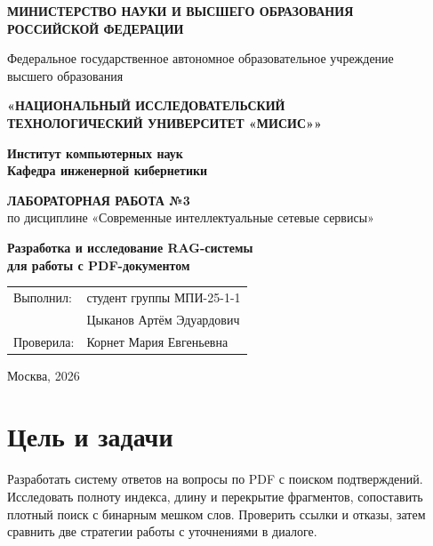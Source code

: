 \documentclass[12pt,a4paper]{article}
\begin{document}
\sloppy
\begin{titlepage}
  \begin{center}
    \textbf{МИНИСТЕРСТВО НАУКИ И ВЫСШЕГО ОБРАЗОВАНИЯ\\РОССИЙСКОЙ ФЕДЕРАЦИИ}
    \vspace{0.5cm}

    Федеральное государственное автономное образовательное учреждение\\
    высшего образования
    \vspace{0.3cm}

    \textbf{«НАЦИОНАЛЬНЫЙ ИССЛЕДОВАТЕЛЬСКИЙ\\
    ТЕХНОЛОГИЧЕСКИЙ УНИВЕРСИТЕТ «МИСИС»»}
    \vspace{1.5cm}

    \textbf{Институт компьютерных наук}\\[0.3cm]
    \textbf{Кафедра инженерной кибернетики}
    \vspace{1.7cm}

    \textbf{ЛАБОРАТОРНАЯ РАБОТА №3}\\[0.4cm]
    по дисциплине «Современные интеллектуальные сетевые сервисы»
    \vspace{1.5cm}

    {\Large\bfseries Разработка и исследование RAG-системы\\
    для работы с PDF-документом}
  \end{center}
  \vfill
  \begin{flushright}
    \begin{tabular}{@{}ll@{}}
      Выполнил: & студент группы МПИ-25-1-1 \\
                & Цыканов Артём Эдуардович \\[0.5cm]
      Проверила: & Корнет Мария Евгеньевна
    \end{tabular}
  \end{flushright}
  \vfill
  \begin{center}Москва, 2026\end{center}
\end{titlepage}

\tableofcontents
\newpage
\hypertarget{ux446ux435ux43bux44c-ux438-ux437ux430ux434ux430ux447ux438}{%
\section{Цель и
задачи}\label{ux446ux435ux43bux44c-ux438-ux437ux430ux434ux430ux447ux438}}

Разработать систему ответов на вопросы по PDF с поиском подтверждений.
Исследовать полноту индекса, длину и перекрытие фрагментов, сопоставить
плотный поиск с бинарным мешком слов. Проверить ссылки и отказы, затем
сравнить две стратегии работы с уточнениями в диалоге.
\end{document}
